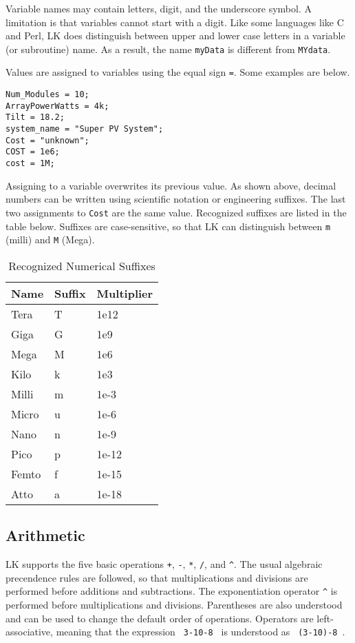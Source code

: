 \documentclass{article}
\begin{document}
Variable names may contain letters, digit, and the underscore symbol.  A limitation is that variables cannot start with a digit.  Like some languages like C and Perl, LK does distinguish between upper and lower case letters in a variable (or subroutine) name. As a result, the name \texttt{myData} is different from \texttt{MYdata}.

Values are assigned to variables using the equal sign \texttt{=}.  Some examples are below.
\begin{verbatim}
Num_Modules = 10;
ArrayPowerWatts = 4k;
Tilt = 18.2;
system_name = "Super PV System";
Cost = "unknown";
COST = 1e6;
cost = 1M;
\end{verbatim}

Assigning to a variable overwrites its previous value.  As shown above, decimal numbers can be written using scientific notation or engineering suffixes.  The last two assignments to \texttt{Cost} are the same value.  Recognized suffixes are listed in the table below.  Suffixes are case-sensitive, so that LK can distinguish between \texttt{m} (milli) and \texttt{M} (Mega).

\begin{table}[ht]
\begin{center}
\begin{tabular}{lll}
Name & Suffix & Multiplier\\
\hline
Tera & T & 1e12\\
Giga & G & 1e9\\
Mega & M & 1e6\\
Kilo & k & 1e3\\
Milli & m & 1e-3\\
Micro & u & 1e-6\\
Nano & n & 1e-9\\
Pico & p & 1e-12\\
Femto & f & 1e-15\\
Atto & a & 1e-18\\
\end{tabular}
\caption{Recognized Numerical Suffixes}
\label{tab_engsuffixes}
\end{center}
\end{table}

\subsection{Arithmetic}

LK supports the five basic operations \texttt{+}, \texttt{-}, \texttt{*}, \texttt{/}, and \texttt{\^}.  The usual algebraic precendence rules are followed, so that multiplications and divisions are performed before additions and subtractions.  The exponentiation operator \texttt{\^} is performed before multiplications and divisions.  Parentheses are also understood and can be used to change the default order of operations.  Operators are left-associative, meaning that the expression \texttt{ 3-10-8 } is understood as \texttt{ (3-10)-8 }.
\end{document}
